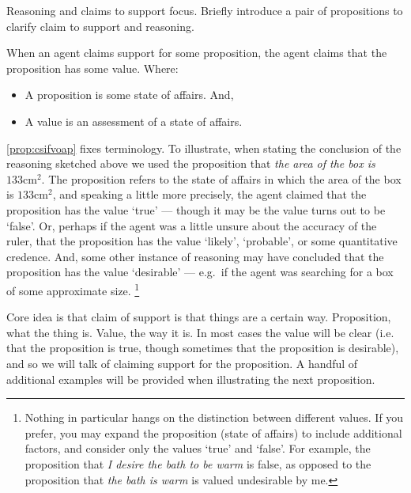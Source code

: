 \begin{note}
  Reasoning and claims to support focus.
  Briefly introduce a pair of propositions to clarify claim to support and reasoning.

  \begin{proposition}\label{prop:csifvoap}
    When an agent claims support for some proposition, the agent claims that the proposition has some value.
    Where:
      \begin{itemize}
      \item A proposition is some state of affairs. And,
      \item A value is an assessment of a state of affairs.
      \end{itemize}
      \vspace{-\topsep}\vspace{-\topsep}
  \end{proposition}
  \autoref{prop:csifvoap} fixes terminology.
  To illustrate, when stating the conclusion of the reasoning sketched above we used the proposition that \emph{the area of the box is \(133\text{cm}^{2}\)}.
  The proposition refers to the state of affairs in which the area of the box is \(133\text{cm}^{2}\), and speaking a little more precisely, the agent claimed that the proposition has the value `true' --- though it may be the value turns out to be `false'.
  Or, perhaps if the agent was a little unsure about the accuracy of the ruler, that the proposition has the value `likely', `probable', or some quantitative credence.
  And, some other instance of reasoning may have concluded that the proposition has the value `desirable' --- e.g.\ if the agent was searching for a box of some approximate size.\nolinebreak
  \footnote{
    Nothing in particular hangs on the distinction between different values.
    If you prefer, you may expand the proposition (state of affairs) to include additional factors, and consider only the values `true' and `false'.
    For example, the proposition that \emph{I desire the bath to be warm} is false, as opposed to the proposition that \emph{the bath is warm} is valued undesirable by me.
  }

  Core idea is that claim of support is that things are a certain way.
  Proposition, what the thing is.
  Value, the way it is.
  In most cases the value will be clear (i.e. that the proposition is true, though sometimes that the proposition is desirable), and so we will talk of claiming support for the proposition.
  A handful of additional examples will be provided when illustrating the next proposition.
\end{note}

